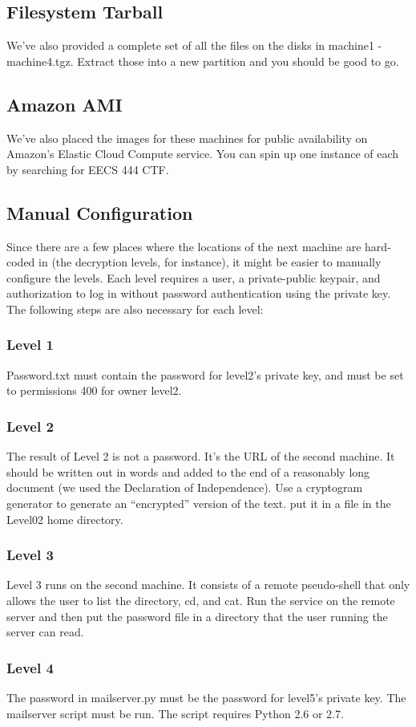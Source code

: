 \documentclass[12pt]{article}
\begin{document}
\subsection{Filesystem Tarball}
We've also provided a complete set of all the files on the disks in machine1 - machine4.tgz.  Extract those into a new partition and you should be good to go.
\subsection{Amazon AMI}
We've also placed the images for these machines for public availability on Amazon's Elastic Cloud Compute service.  You can spin up one instance of each by searching for EECS 444 CTF.
\subsection{Manual Configuration}
Since there are a few places where the locations of the next machine are hard-coded in (the decryption levels, for instance), it might be easier to manually configure the levels.  Each level requires a user, a private-public keypair, and authorization to log in without password authentication using the private key.  The following steps are also necessary for each level:
\subsubsection{Level 1}
Password.txt must contain the password for level2's private key, and must be set to permissions 400 for owner level2.
\subsubsection{Level 2}
The result of Level 2 is not a password. It's the URL of the second machine. It
should be written out in words and added to the end of a reasonably long
document (we used the Declaration of Independence). Use a cryptogram generator
to generate an ``encrypted'' version of the text. put it in a file in the
Level02 home directory.
\subsubsection{Level 3}
Level 3 runs on the second machine. It consists of a remote pseudo-shell that
only allows the user to list the directory, cd, and cat. Run the service on the
remote server and then put the password file in a directory that the user
running the server can read.
\subsubsection{Level 4}
The password in mailserver.py must be the password for level5's private key.
The mailserver script must be run. The script requires Python 2.6 or 2.7.
\end{document}

